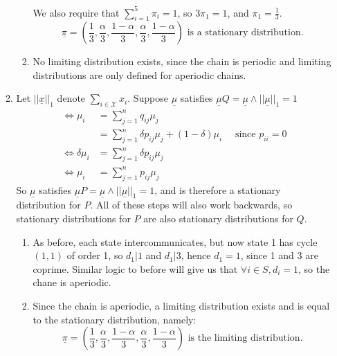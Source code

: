 \documentclass{article}
\begin{document}
\begin{enumerate}
\begin{enumerate}
\begin{enumerate}
We also require that $\sum\limits^5_{i=1}\pi_i=1$, so $3\pi_1 = 1$, and $\pi_1 = \frac{1}{3}$.
$$
\underline{\pi} = \left(\frac{1}{3},\frac{\alpha}{3},\frac{1-\alpha}{3},\frac{\alpha}{3},\frac{1-\alpha}{3}\right) \mbox{ is a stationary distribution.}
$$
\item
No limiting distribution exists, since the chain is periodic and limiting distributions are only defined for aperiodic chains.
\end{enumerate}
\item 
Let $||\underline{x}||_1$ denote $\sum\limits_{i\in\mathcal{X}}x_i$. Suppose $\underline{\mu}$ satisfies $\underline{\mu} Q=\underline{\mu} \wedge ||\underline{\mu}||_1 = 1$
\begin{align*}
\iff \mu_i &= \sum^n_{j=1}q_{ij}\mu_j\\
&= \sum^n_{j=1}\delta p_{ij}\mu_j + (1-\delta)\mu_i \quad \mbox{ since $p_{ii}=0$}\\
\iff \delta \mu_i &= \sum^n_{j=1}\delta p_{ij} \mu_j\\
\iff \mu_i &= \sum^n_{j=1}p_{ij}\mu_j
\end{align*}
So $\underline{\mu}$ satisfies $\underline{\mu}P = \underline{\mu} \wedge ||\underline{\mu}||_1 = 1$, and is therefore a stationary distribution for $P$. All of these steps will also work backwards, so stationary distributions for $P$ are also stationary distributions for $Q$.
\begin{enumerate}
\item
As before, each state intercommunicates, but now state 1 has cycle $(1,1)$ of order 1, so $d_1|1$ and $d_1 | 3$, hence $d_1 =1$, since 1 and 3 are coprime. Similar logic to before will give us that $\forall i \in S, d_i = 1$, so the chane is aperiodic.
\item
Since the chain is aperiodic, a limiting distribution exists and is equal to the stationary distribution, namely:
$$
\underline{\pi} = \left(\frac{1}{3},\frac{\alpha}{3},\frac{1-\alpha}{3},\frac{\alpha}{3},\frac{1-\alpha}{3}\right) \mbox{ is the limiting distribution.}
$$
\end{enumerate}

\end{enumerate}
\end{enumerate}
\end{document}

